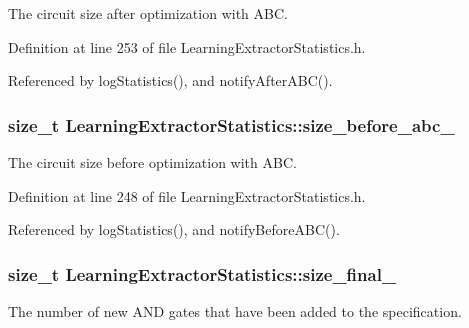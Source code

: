 The circuit size after optimization with A\-B\-C. 



Definition at line 253 of file Learning\-Extractor\-Statistics.\-h.



Referenced by log\-Statistics(), and notify\-After\-A\-B\-C().

\hypertarget{classLearningExtractorStatistics_ae1dfe12c84dc72fd7b8f664ebe069103}{
\subsubsection[{size\-\_\-before\-\_\-abc\-\_\-}]{\setlength{\rightskip}{0pt plus 5cm}size\-\_\-t Learning\-Extractor\-Statistics\-::size\-\_\-before\-\_\-abc\-\_\-\hspace{0.3cm}{\ttfamily [protected]}}}\label{classLearningExtractorStatistics_ae1dfe12c84dc72fd7b8f664ebe069103}


The circuit size before optimization with A\-B\-C. 



Definition at line 248 of file Learning\-Extractor\-Statistics.\-h.



Referenced by log\-Statistics(), and notify\-Before\-A\-B\-C().

\hypertarget{classLearningExtractorStatistics_a4b09852748af7edc14a8a884dac6efce}{
\subsubsection[{size\-\_\-final\-\_\-}]{\setlength{\rightskip}{0pt plus 5cm}size\-\_\-t Learning\-Extractor\-Statistics\-::size\-\_\-final\-\_\-\hspace{0.3cm}{\ttfamily [protected]}}}\label{classLearningExtractorStatistics_a4b09852748af7edc14a8a884dac6efce}


The number of new A\-N\-D gates that have been added to the specification. 




